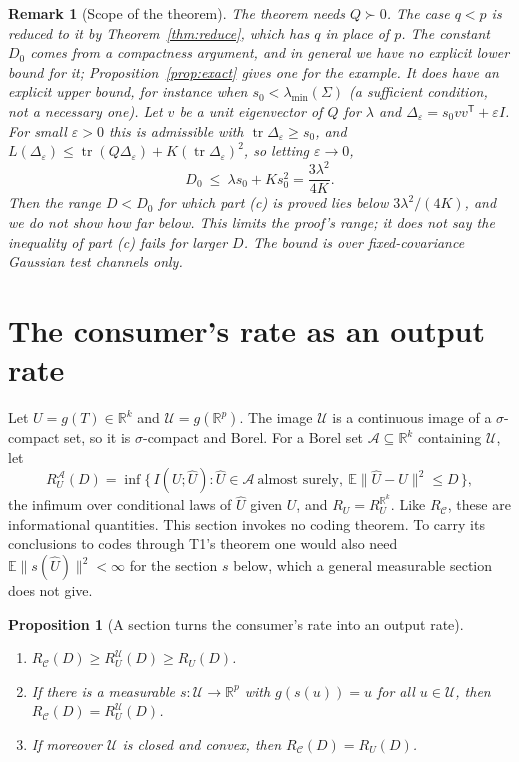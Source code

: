 \documentclass[11pt,onecolumn]{IEEEtran}
\newtheorem{proposition}[theorem]{Proposition}
\newtheorem{remark}[theorem]{Remark}
\newcommand{\E}{\mathbb{E}}
\newcommand{\R}{\mathbb{R}}
\newcommand{\tr}{\operatorname{tr}}
\newcommand{\lmin}{\lambda_{\min}}
\newcommand{\cU}{\mathcal U}
\newcommand{\RC}{R_{\mathcal C}}
\begin{document}
\begin{remark}[Scope of the theorem]\label{rem:scope}
The theorem needs $Q\succ0$. The case $q<p$ is reduced to it by
Theorem~\ref{thm:reduce}, which has $q$ in place of $p$. The constant $D_0$ comes from a compactness
argument, and in general we have no explicit lower bound for it;
Proposition~\ref{prop:exact} gives one for the example. It does have an explicit upper
bound, for instance when $s_0<\lmin(\Sigma)$ (a sufficient condition, not a necessary
one). Let $v$ be a unit eigenvector of $Q$ for $\lambda$ and
$\Delta_\varepsilon=s_0vv^{\mathsf T}+\varepsilon I$. For small $\varepsilon>0$ this is
admissible with $\tr\Delta_\varepsilon\ge s_0$, and
$L(\Delta_\varepsilon)\le\tr(Q\Delta_\varepsilon)+K(\tr\Delta_\varepsilon)^2$, so letting
$\varepsilon\to0$,
\[
D_0\ \le\ \lambda s_0+Ks_0^2=\frac{3\lambda^2}{4K}.
\]
Then the range $D<D_0$ for which part (c) is proved lies below $3\lambda^2/(4K)$, and we
do not show how far below. This limits the proof's range; it does not say the inequality
of part (c) fails for larger $D$.
The bound is over fixed-covariance Gaussian test channels only.
\end{remark}

\section{The consumer's rate as an output rate}\label{sec:output}

Let $U=g(T)\in\R^k$ and $\cU=g(\R^p)$. The image $\cU$ is a continuous image of a
$\sigma$-compact set, so it is $\sigma$-compact and Borel. For a Borel set
$\mathcal A\subseteq\R^k$ containing $\cU$, let
\[
R_U^{\mathcal A}(D)=\inf\{\,I(U;\hat U):\hat U\in\mathcal A\ \text{almost surely},\
\E\|\hat U-U\|^2\le D\,\},
\]
the infimum over conditional laws of $\hat U$ given $U$, and $R_U=R_U^{\R^k}$. Like
$\RC$, these are informational quantities. This section invokes no coding theorem. To
carry its conclusions to codes through T1's theorem one would also need
$\E\|s(\hat U)\|^2<\infty$ for the section $s$ below, which a general measurable section
does not give.

\begin{proposition}[A section turns the consumer's rate into an output rate]\label{prop:B}
\begin{enumerate}
\item[(a)] $\RC(D)\ge R_U^{\cU}(D)\ge R_U(D)$.
\item[(b)] If there is a measurable $s:\cU\to\R^p$ with $g(s(u))=u$ for all
$u\in\cU$, then $\RC(D)=R_U^{\cU}(D)$.
\item[(c)] If moreover $\cU$ is closed and convex, then $\RC(D)=R_U(D)$.
\end{enumerate}
\end{proposition}
\end{document}
